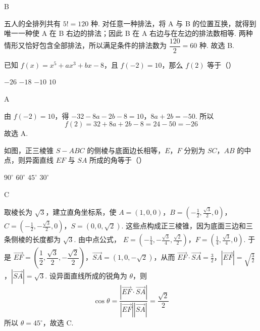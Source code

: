 \begin{answer}B\end{answer}

\begin{solution}
五人的全排列共有 \(5!=120\) 种. 对任意一种排法，将 A 与 B 的位置互换，就得到唯一一种使 A 在 B 右边的排法；因此 B 在 A 右边与在左边的排法数相等. 两种情形又恰好包含全部排法，所以满足条件的排法数为 \(\dfrac{120}{2}=60\) 种. 故选 B.
\end{solution}


\begin{problem}
已知 \(f(x)=x^5+ax^3+bx-8\)，且 \(f(-2)=10\)，那么 \(f(2)\) 等于（\quad）

\choices
    {\(-26\)}
    {\(-18\)}
    {\(-10\)}
    {\(10\)}
\end{problem}

\begin{answer}A\end{answer}

\begin{solution}
由 \(f(-2)=10\)，得
\(-32-8a-2b-8=10\)，\(8a+2b=-50\).
所以
\[
f(2)=32+8a+2b-8=24-50=-26
\]
故选 A.
\end{solution}


\begin{problem}
如图，正三棱锥 \(S-ABC\) 的侧棱与底面边长相等，\(E\)，\(F\) 分别为 \(SC\)，\(AB\) 的中点，则异面直线 \(EF\) 与 \(SA\) 所成的角等于（\quad）


\choices
    {\(90^\circ\)}
    {\(60^\circ\)}
    {\(45^\circ\)}
    {\(30^\circ\)}
\end{problem}

\begin{answer}C\end{answer}

\begin{solution}
取棱长为 \(\sqrt3\)，建立直角坐标系，使
\(A=(1,0,0)\)，\(B=\left(-\frac12,\frac{\sqrt3}{2},0\right)\)，\(C=\left(-\frac12,-\frac{\sqrt3}{2},0\right)\)，\(S=(0,0,\sqrt2)\).
这些点构成正三棱锥，因为底面三边和三条侧棱的长度都为 \(\sqrt3\). 由中点公式，
\(E=\left(-\frac14,-\frac{\sqrt3}{4},\frac{\sqrt2}{2}\right)\)，\(F=\left(\frac14,\frac{\sqrt3}{4},0\right)\).
于是 \(\overrightarrow{EF}=\left(\dfrac12,\dfrac{\sqrt3}{2},-\dfrac{\sqrt2}{2}\right)\)，\(\overrightarrow{SA}=(1,0,-\sqrt2)\)，从而
\(\overrightarrow{EF}\cdot\overrightarrow{SA}=\frac32\)，\(\left|\overrightarrow{EF}\right|=\sqrt{\frac32}\)，\(\left|\overrightarrow{SA}\right|=\sqrt3\).
设异面直线所成的锐角为 \(\theta\)，则
\[
\cos\theta=\frac{\left|\overrightarrow{EF}\cdot\overrightarrow{SA}\right|}{\left|\overrightarrow{EF}\right|\left|\overrightarrow{SA}\right|}=\frac{\sqrt2}{2}
\]
所以 \(\theta=45^\circ\)，故选 C.
\end{solution}


